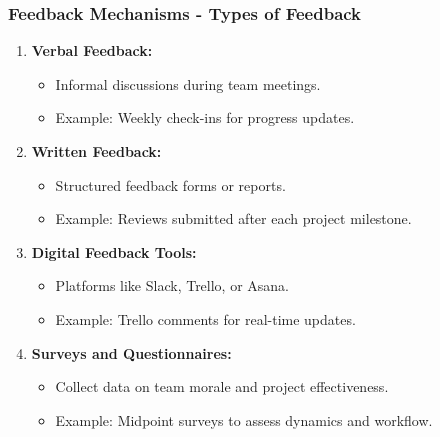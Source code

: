 \documentclass[aspectratio=169]{beamer}
\begin{document}
\begin{frame}[fragile]
    \frametitle{Feedback Mechanisms - Types of Feedback}
    \begin{enumerate}
        \item \textbf{Verbal Feedback:}
        \begin{itemize}
            \item Informal discussions during team meetings.
            \item Example: Weekly check-ins for progress updates.
        \end{itemize}
        
        \item \textbf{Written Feedback:}
        \begin{itemize}
            \item Structured feedback forms or reports.
            \item Example: Reviews submitted after each project milestone.
        \end{itemize}
        
        \item \textbf{Digital Feedback Tools:}
        \begin{itemize}
            \item Platforms like Slack, Trello, or Asana.
            \item Example: Trello comments for real-time updates.
        \end{itemize}
        
        \item \textbf{Surveys and Questionnaires:}
        \begin{itemize}
            \item Collect data on team morale and project effectiveness.
            \item Example: Midpoint surveys to assess dynamics and workflow.
        \end{itemize}
    \end{enumerate}
\end{frame}
\end{document}
